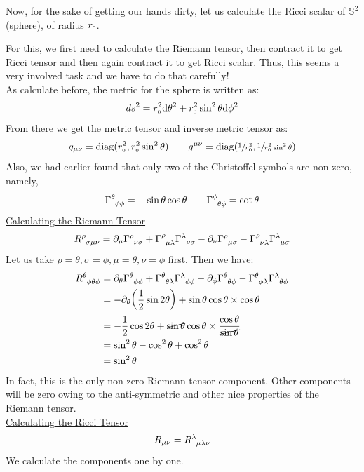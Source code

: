 Now, for the sake of getting our hands dirty, let us calculate the Ricci scalar of $\mathbb{S}^2$ (sphere), of radius $r_{\text{\tiny 0}}$. 
\begin{figure}[H]
    \centering 
    
\end{figure}
\noindent
For this, we first need to calculate the Riemann tensor, then contract it to get Ricci tensor and then again contract it to get Ricci scalar. Thus, this seems a very involved task and we have to do that carefully!\\[0.2cm]
As calculate before, the metric for the sphere is written as:
$$ds^2 = r_{\text{\tiny 0}}^2\dd\theta^2 + r_{\text{\tiny 0}}^2\sin^2\theta\dd\phi^2 $$
From there we get the metric tensor and inverse metric tensor as:
$$g_{\mu\nu} = \mathrm{diag}(r_{\text{\tiny 0}}^2, r_{\text{\tiny 0}}^2\sin^2\theta)\qquad g^{\mu\nu} = \mathrm{diag}(\sfrac{1}{r_{\text{\tiny 0}}^2}, \sfrac{1}{r_{\text{\tiny 0}}^2\sin^2\theta})$$
Also, we had earlier found that only two of the Christoffel symbols are non-zero, namely,
$$\chris{\theta}{\phi}{\phi}=-\sin\theta \cos\theta \qquad \chris{\phi}{\theta}{\phi} = \cot\theta$$
\underline{Calculating the Riemann Tensor}
$$\rie{\rho}{\sigma}{\mu}{\nu} = \partial_\mu \chris{\rho}{\nu}{\sigma} + \chris{\rho}{\mu}{\lambda}\chris{\lambda}{\nu}{\sigma} -\partial_\nu \chris{\rho}{\mu}{\sigma} - \chris{\rho}{\nu}{\lambda}\chris{\lambda}{\mu}{\sigma}  $$
Let us take $\rho =\theta, \sigma = \phi, \mu=\theta, \nu = \phi$ first. Then we have:
\begin{align*}
    \rie{\theta}{\phi}{\theta}{\phi} &= \partial_\theta \chris{\theta}{\phi}{\phi} + \chris{\theta}{\theta}{\lambda}\chris{\lambda}{\phi}{\phi} -\partial_\phi \chris{\theta}{\theta}{\phi} - \chris{\theta}{\phi}{\lambda}\chris{\lambda}{\theta}{\phi} \\
    &=-\partial_\theta \qty(\frac{1}{2}\sin 2\theta) + \sin\theta\cos\theta \times \cos\theta\\
    &=-\frac{1}{2}\cos 2\theta +\cancel{ \sin\theta}\cos\theta \times \frac{\cos\theta}{\cancel{ \sin\theta}}\\
    &=\sin^2\theta-\cos^2\theta +\cos^2\theta\\
    &=\sin^2\theta
\end{align*}
In fact, this is the only non-zero Riemann tensor component. Other components will be zero owing to the anti-symmetric and other nice properties of the Riemann tensor. \\[0.2cm]
\underline{Calculating the Ricci Tensor}
$$R_{\mu \nu} = \rie{\lambda}{\mu}{\lambda}{\nu}$$
We calculate the components one by one.
